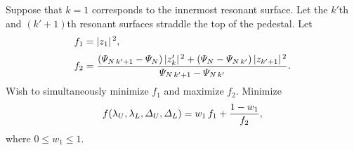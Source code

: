 \documentclass[notitlepage,12pt]{article}
\begin{document}
Suppose that $k=1$ corresponds to the innermost resonant surface. Let the $k'$th and $(k'+1)$th resonant surfaces straddle the top of the
pedestal. 
Let
\begin{align}
f_1 &=|z_1|^{\,2},\\[0.5ex]
f_2 &=\frac{ ({\mit\Psi}_{N\,k'+1}  - {\mit\Psi}_N)\,|z_k'|^{\,2} + ({\mit\Psi}_N - {\mit\Psi}_{N\,k'})\,|z_{k'+1}|^{\,2}}{{\mit\Psi}_{N\,k'+1}-{\mit\Psi}_{N\,k'}}.
\end{align}
Wish to simultaneously minimize $f_1$ and maximize $f_2$. Minimize
\begin{equation}
f (\lambda_U,\lambda_L,{\mit\Delta}_U,{\mit\Delta}_L)= w_1\,f_1+ \frac{1-w_1}{f_2},
\end{equation}
where $0\leq w_1\leq 1$. 
\end{document}
